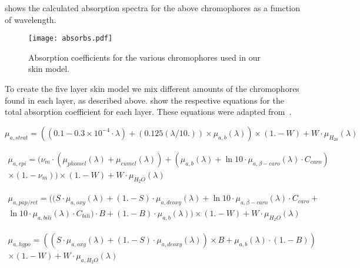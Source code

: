  shows the calculated absorption spectra for the above chromophores as a function of wavelength.

\begin{figure}[!htpb]
	\centering
	\texttt{[image: absorbs.pdf]}
	\caption{Absorption coefficients for the various chromophores used in our skin model.}
	\label{fig:absorcoeff}
\end{figure}

To create the five layer skin model we mix different amounts of the chromophores found in each layer, as described above.
 show the respective equations for the total absorption coefficient for each layer.
These equations were adapted from~\cite{meglinski2002quantitative,iglesias2015biophysically,jacques2013optical}.

\begin{equation}
\mu_{a,strat}= ((0.1 - 0.3\times10^{-4}\cdot\lambda) + (0.125(\lambda/10.))\times \mu_{a,b}(\lambda))\times(1. - W) + W\cdot\mu_{H_20}(\lambda)
\label{eqn:stratabs}
\end{equation}

\begin{equation}
\begin{split}
\mu_{a,epi}= (\nu_m \cdot (\mu_{phomel}(\lambda) + \mu_{eumel}(\lambda)) + (\mu_{a,b}(\lambda) + \ln10 \cdot \mu_{a,\beta-caro}(\lambda) \cdot C_{caro}) \\ \times (1. - \nu_m)) \times(1. - W) + W \cdot \mu_{H_2O}(\lambda)
\end{split}
\label{eqn:epiabs}
\end{equation}

\begin{equation}
\begin{split}
\mu_{a,pap/ret}=((S \cdot \mu_{a,oxy}(\lambda) + (1. - S) \cdot \mu_{a,deoxy}(\lambda) + \ln10 \cdot \mu_{a,\beta-caro}(\lambda) \cdot C_{caro} + \\ \ln10 \cdot \mu_{a,bili}(\lambda)\cdot C_{bili})\cdot B +  (1. - B)\cdot \mu_{a,b}(\lambda)) \times (1. - W) + W \cdot \mu_{H_2O}(\lambda)
\end{split}
\label{eqn:dermisabs}
\end{equation}

\begin{equation}
\begin{split}
\mu_{a,hypo}=((S\cdot \mu_{a,oxy}(\lambda) + (1. - S) \cdot \mu_{a,deoxy}(\lambda)) \times B + \mu_{a,b}(\lambda) \cdot (1. - B))\\ \times (1. - W) + W \cdot \mu_{a,H_2O}(\lambda)
\end{split}
\label{eqn:hypoabs}
\end{equation}

